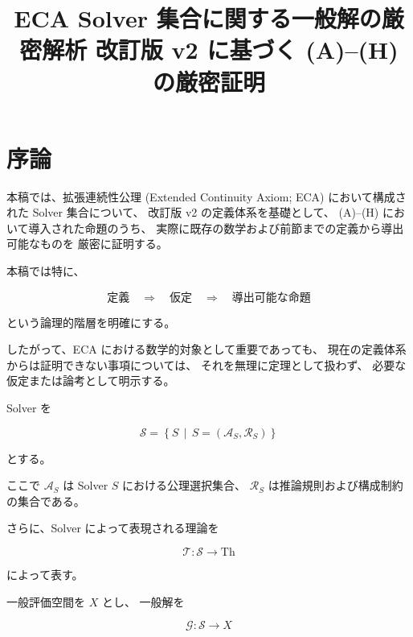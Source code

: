 \documentclass[a4paper,11pt]{article}
\title{ECA Solver 集合に関する一般解の厳密解析 改訂版 v2 に基づく (A)--(H) の厳密証明}
\author{}
\date{}
\newcommand{\Solver}{\mathcal{S}}
\newcommand{\Aset}{\mathcal{A}}
\newcommand{\Rset}{\mathcal{R}}
\newcommand{\Th}{\mathrm{Th}}
\newcommand{\Eval}{\mathcal{G}}
\begin{document}
\maketitle
\tableofcontents


\section{序論}

本稿では、拡張連続性公理
(Extended Continuity Axiom; ECA)
において構成された Solver 集合について、
改訂版 v2 の定義体系を基礎として、
(A)--(H) において導入された命題のうち、
実際に既存の数学および前節までの定義から導出可能なものを
厳密に証明する。

本稿では特に、

\begin{equation}
    \text{定義}
    \quad\Longrightarrow\quad
    \text{仮定}
    \quad\Longrightarrow\quad
    \text{導出可能な命題}
\end{equation}

という論理的階層を明確にする。

したがって、ECA における数学的対象として重要であっても、
現在の定義体系からは証明できない事項については、
それを無理に定理として扱わず、
必要な仮定または論考として明示する。

Solver を

\begin{equation}
    \Solver
    =
    \left\{
        S
        \,\middle|\,
        S=(\Aset_S,\Rset_S)
    \right\}
\end{equation}

とする。

ここで $\Aset_S$ は Solver $S$ における公理選択集合、
$\Rset_S$ は推論規則および構成制約の集合である。

さらに、Solver によって表現される理論を

\begin{equation}
    \mathcal{T}:
    \Solver\longrightarrow\Th
\end{equation}

によって表す。

一般評価空間を $X$ とし、
一般解を

\begin{equation}
    \Eval:
    \Solver\longrightarrow X
\end{equation}
\end{document}
